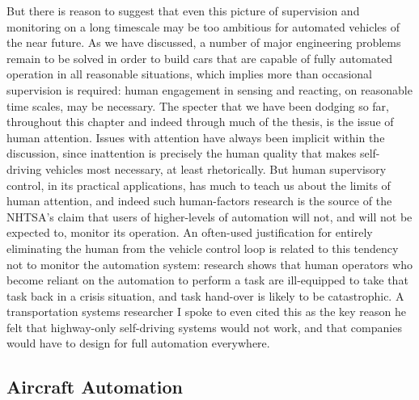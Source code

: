 But there is reason to suggest that even this picture of supervision
and monitoring on a long timescale may be too ambitious for automated
vehicles of the near future. As we have discussed, a number of major
engineering problems remain to be solved in order to build cars that
are capable of fully automated operation in all reasonable situations,
which implies more than occasional supervision is required: human engagement in
sensing and reacting, on reasonable time scales, may be necessary. The
specter that we have been dodging so far, throughout this chapter and
indeed through much of the thesis, is the issue of human attention.
Issues with attention have always been implicit within the discussion,
since inattention is precisely the human quality that makes
self-driving vehicles most necessary, at least rhetorically. But human
supervisory control, in its practical applications, has much to teach
us about the limits of human attention, and indeed such human-factors
research is the source of the NHTSA's claim that users of
higher-levels of automation will not, and will not be expected to,
monitor its operation. An often-used justification
for entirely eliminating the human from the vehicle control loop is
related to this tendency not to monitor the automation system:
research shows that human operators who become reliant on the
automation to perform a task are ill-equipped to take that task back
in a crisis situation, and task hand-over is likely to be
catastrophic.\cite{???} A transportation systems researcher I spoke to
even cited this as the key reason he felt that highway-only
self-driving systems would not work, and that companies would have to
design for full automation everywhere.

\subsection{Aircraft Automation}


